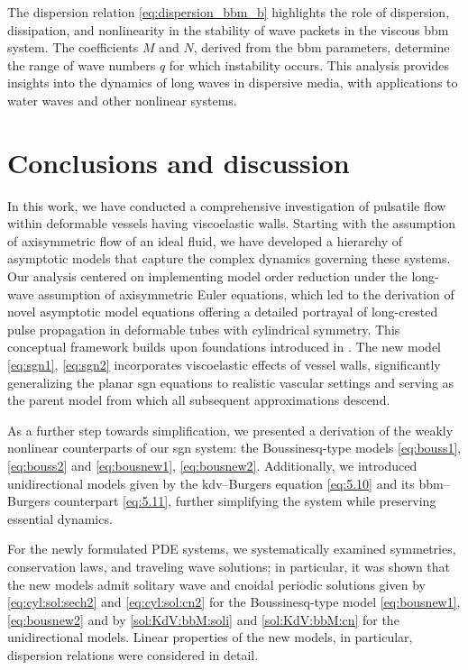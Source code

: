 \documentclass[alpha-refs, 12pt]{wiley-article}
\begin{document}
The dispersion relation \eqref{eq:dispersion_bbm_b} highlights the role of dispersion, dissipation, and nonlinearity in the stability of wave packets in the viscous \acrshort{bbm} system. The coefficients $M$ and $N$, derived from the \acrshort{bbm} parameters, determine the range of wave numbers $q$ for which instability occurs. This analysis provides insights into the dynamics of long waves in dispersive media, with applications to water waves and other nonlinear systems.



\section{Conclusions and discussion}\label{sec:discussion}

In this work, we have conducted a comprehensive investigation of pulsatile flow within deformable vessels having viscoelastic walls. Starting with the assumption of axisymmetric flow of an ideal fluid, we have developed a hierarchy of asymptotic models that capture the complex dynamics governing these systems. Our analysis centered on implementing model order reduction under the long-wave assumption of axisymmetric Euler equations, which led to the derivation of novel asymptotic model equations offering a detailed portrayal of long-crested pulse propagation in deformable tubes with cylindrical symmetry. This conceptual framework builds upon foundations introduced in \cite{Mitsotakis2018}. The new model \eqref{eq:sgn1}, \eqref{eq:sgn2} incorporates viscoelastic effects of vessel walls, significantly generalizing the planar \acrshort{sgn} equations to realistic vascular settings and serving as the parent model from which all subsequent approximations descend.

As a further step towards simplification, we presented a derivation of the weakly nonlinear counterparts of our \acrshort{sgn} system: the Boussinesq-type models \eqref{eq:bouss1}, \eqref{eq:bouss2}  and \eqref{eq:bousnew1}, \eqref{eq:bousnew2}. Additionally, we introduced unidirectional models given by the \acrshort{kdv}--Burgers equation \eqref{eq:5.10} and its \acrshort{bbm}--Burgers counterpart \eqref{eq:5.11}, further simplifying the system while preserving essential dynamics.

For the newly formulated PDE systems, we systematically examined symmetries, conservation laws, and traveling wave solutions; in particular, it was shown that the new models admit solitary wave and cnoidal periodic solutions given by \eqref{eq:cyl:sol:sech2} and \eqref{eq:cyl:sol:cn2} for the Boussinesq-type model \eqref{eq:bousnew1}, \eqref{eq:bousnew2} and by \eqref{sol:KdV:bbM:soli} and \eqref{sol:KdV:bbM:cn} for the unidirectional models. Linear properties of the new models, in particular, dispersion relations were considered in detail. 
\end{document}

